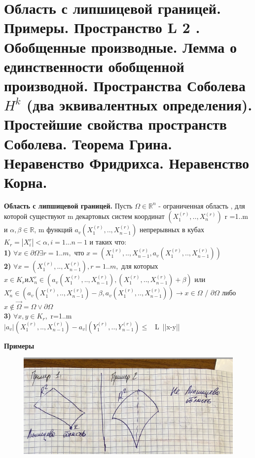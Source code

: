 \documentclass[__main__.tex]{subfiles}
\begin{document}
\section{Область с липшицевой границей. Примеры. Пространство L 2 . Обобщенные производные. Лемма о единственности обобщенной производной. Пространства Соболева $H^k$ (два эквивалентных определения). Простейшие свойства пространств Соболева. Теорема Грина. Неравенство Фридрихса. Неравенство Корна.}

\begin{definition}
	\textbf{Область с липшицевой границей.} Пусть $\Omega \in \mathbb{R}^{n}$ - ограниченная область , для которой существуют m декартовых систем координат $(X_{1}^{(r)},..,X_{n}^{(r)})$  r =1..m и $\alpha,\beta \in \mathbb{R}$, m функций $a_{v}(X_{1}^{(r)},..,X_{n-1}^{(r)})$ непрерывных в кубах $K_{r}={|X^{r}_{i}|<\alpha, i=1...n-1}$ и таких что:\\
	\textbf{1)} $\forall x\in \partial\Omega \exists r=1..m,$ что $x=(X_{1}^{(r)},..,X_{n-1}^{(r)},a_{v}(X_{1}^{(r)},..,X_{n-1}^{(r)}))$\\
	\textbf{2)} $\forall x=(X_{1}^{(r)},..,X_{n-1}^{(r)}), r=1..m ,$ для которых $x\in K_{r} и X^{r}_{n} \in (a_{v}(X_{1}^{(r)},..,X_{n-1}^{(r)}),(X_{1}^{(r)},..,X_{n-1}^{(r)})+\beta)$ или \\
	$X^{r}_{n} \in (a_{v}(X_{1}^{(r)},..,X_{n-1}^{(r)})- \beta,a_{v}(X_{1}^{(r)},..,X_{n-1}^{(r)}))\rightarrow x \in \Omega$ / $\partial\Omega$ либо $x \notin \vec{\Omega}=\Omega \vee \partial\Omega$\\
	\textbf{3)}	$\forall x,y \in K_{r},$ r=1..m\\
	$|a_{v}|(X_{1}^{(r)},..,X_{n-1}^{(r)})-a_{v}|(Y_{1}^{(r)},..,Y_{n-1}^{(r)})\leq$  \ L\ ||x-y||

\textbf{Примеры}
\begin{figure}[H]
	\centering
	\includegraphics[width=0.7\linewidth]{screenshot001}
	\caption{}
	\label{fig:screenshot001}
\end{figure}

\end{definition}
\end{document}
